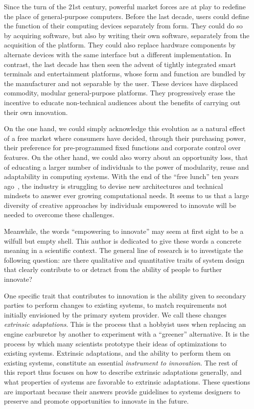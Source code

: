 \documentclass[a4paper]{article}
\begin{document}
Since the turn of the 21st century, powerful market forces are at play
to redefine the place of general-purpose computers. Before the last
decade, users could define the function of their computing devices
separately from form. They could do so by acquiring software, but also
by writing their own software, separately from the acquisition of the
platform. They could also replace hardware components by alternate
devices with the same interface but a different implementation.  In
contrast, the last decade has then seen the advent of tightly
integrated smart terminals and entertainment platforms, whose form and
function are bundled by the manufacturer and not separable by the
user. These devices have displaced commodity, modular general-purpose
platforms. They progressively erase the incentive to educate
non-technical audiences about the benefits of carrying out their own
innovation.

On the one hand, we could simply acknowledge this evolution as a
natural effect of a free market where consumers have decided, through
their purchasing power, their preference for pre-programmed fixed
functions and corporate control over features. On the other hand, we
could also worry about an opportunity loss, that of educating a larger
number of individuals to the power of modularity, reuse and
adaptability in computing systems. With the end of the ``free lunch''
ten years ago~\cite{ronen.01.ieee,sutter.05}, the industry is
struggling to devise new architectures and technical mindsets to
answer ever growing computational needs. It seems to us that a large
diversity of creative approaches by individuals empowered to innovate
will be needed to overcome these challenges.

Meanwhile, the words ``empowering to innovate'' may seem at first
sight to be a wilfull but empty shell. This author is dedicated to
give these words a concrete meaning in a scientific context. The
general line of research is to investigate the following question: are
there qualitative and quantitative traits of system design that
clearly contribute to or detract from the ability of people to further
innovate?

One specific trait that contributes to
innovation is the ability given to secondary parties to perform changes
to existing systems, to match requirements not initially envisioned by
the primary system provider. We call these changes \emph{extrinsic
  adaptations}. This is the process that a hobbyist uses when
replacing an engine carburetor by another to experiment with a
``greener'' alternative. It is the process by which many scientists
prototype their ideas of optimizations to existing systems. Extrinsic
adaptations, and the ability to perform them on existing systems,
constitute an essential \emph{instrument to innovation}. The rest of this
report thus focuses on how to describe
  extrinsic adaptations generally, and what properties of systems are
  favorable to extrinsic adaptations. These questions are important
because their answers provide guidelines to systems designers to
preserve and promote opportunities to innovate in the future.
\end{document}
